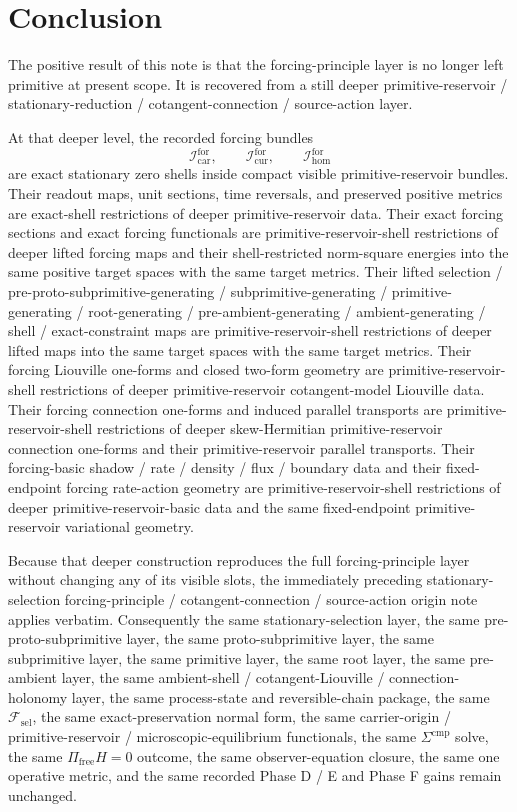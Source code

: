 \documentclass[11pt]{article}
\newcommand{\StemFunctional}{\mathscr F_{\mathrm{sel}}}
\newcommand{\Car}{\mathrm{car}}
\newcommand{\Cur}{\mathrm{cur}}
\newcommand{\Hom}{\mathrm{hom}}
\newcommand{\ForSpace}[1]{\mathcal I_{#1}^{\mathrm{for}}}
\begin{document}
\section{Conclusion}

The positive result of this note is that the forcing-principle layer is no longer left primitive at present scope. It is recovered from a still deeper primitive-reservoir / stationary-reduction / cotangent-connection / source-action layer.

At that deeper level, the recorded forcing bundles
\[
\ForSpace{\Car},\qquad
\ForSpace{\Cur},\qquad
\ForSpace{\Hom}
\]
are exact stationary zero shells inside compact visible primitive-reservoir bundles. Their readout maps, unit sections, time reversals, and preserved positive metrics are exact-shell restrictions of deeper primitive-reservoir data. Their exact forcing sections and exact forcing functionals are primitive-reservoir-shell restrictions of deeper lifted forcing maps and their shell-restricted norm-square energies into the same positive target spaces with the same target metrics. Their lifted selection / pre-proto-subprimitive-generating / subprimitive-generating / primitive-generating / root-generating / pre-ambient-generating / ambient-generating / shell / exact-constraint maps are primitive-reservoir-shell restrictions of deeper lifted maps into the same target spaces with the same target metrics. Their forcing Liouville one-forms and closed two-form geometry are primitive-reservoir-shell restrictions of deeper primitive-reservoir cotangent-model Liouville data. Their forcing connection one-forms and induced parallel transports are primitive-reservoir-shell restrictions of deeper skew-Hermitian primitive-reservoir connection one-forms and their primitive-reservoir parallel transports. Their forcing-basic shadow / rate / density / flux / boundary data and their fixed-endpoint forcing rate-action geometry are primitive-reservoir-shell restrictions of deeper primitive-reservoir-basic data and the same fixed-endpoint primitive-reservoir variational geometry.

Because that deeper construction reproduces the full forcing-principle layer without changing any of its visible slots, the immediately preceding stationary-selection forcing-principle / cotangent-connection / source-action origin note applies verbatim. Consequently the same stationary-selection layer, the same pre-proto-subprimitive layer, the same proto-subprimitive layer, the same subprimitive layer, the same primitive layer, the same root layer, the same pre-ambient layer, the same ambient-shell / cotangent-Liouville / connection-holonomy layer, the same process-state and reversible-chain package, the same \(\StemFunctional\), the same exact-preservation normal form, the same carrier-origin / primitive-reservoir / microscopic-equilibrium functionals, the same \(\Sigma^{\mathrm{cmp}}\) solve, the same \(\Pi_{\mathrm{free}}H=0\) outcome, the same observer-equation closure, the same one operative metric, and the same recorded Phase D / E and Phase F gains remain unchanged.
\end{document}
